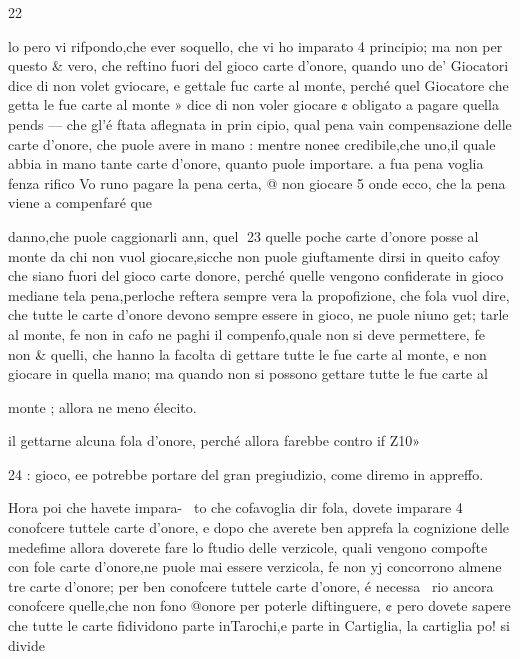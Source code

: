 \documentclass[12pt,a6paper]{article}
\begin{document}
 
 

 

 

 

 

 

 

22

lo pero vi rifpondo,che ever
soquello, che vi ho imparato 4
principio; ma non per questo &
vero, che reftino fuori del gioco carte d’onore, quando uno
de’ Giocatori dice di non volet
gviocare, e gettale fuc carte al
monte, perché quel Giocatore
che getta le fue carte al monte »
dice di non voler giocare ¢
obligato a pagare quella pends —
che gl’é ftata aflegnata in prin
cipio, qual pena vain compensazione delle carte d’onore, che
puole avere in mano : mentre
none¢ credibile,che uno,il quale
abbia in mano tante carte d’onore, quanto puole importare. a
fua pena voglia fenza rifico Vo
runo pagare la pena certa, @
non giocare 5 onde ecco, che la
pena viene a compenfaré que

danno,che puole caggionarli ann,
quel
23
quelle poche carte d’onore posse al monte da chi non vuol
giocare,sicche non puole giuftamente dirsi in queito cafoy che
siano fuori del gioco carte
donore, perché quelle vengono confiderate in gioco mediane
tela pena,perloche reftera sempre vera la propofizione, che
fola vuol dire, che tutte le carte d’onore devono sempre essere in gioco, ne puole niuno get;
tarle al monte, fe non in cafo
ne paghi il compenfo,quale non
si deve permettere, fe non &
quelli, che hanno la facolta di
gettare tutte le fue carte al
monte, e non giocare in quella
mano; ma quando non si possono gettare tutte le fue carte al

monte ; allora ne meno élecito.

il gettarne alcuna fola d’onore,
perché allora farebbe contro if
Z10»

 

 
 

24 :
gioco, ee potrebbe portare del
gran pregiudizio, come diremo
in appreffo.

Hora poi che havete impara-~
to che cofavoglia dir fola, dovete imparare 4 conofcere tuttele carte d’onore, e dopo che
averete ben apprefa la cognizione delle medefime allora doverete fare lo ftudio delle verzicole, quali vengono compofte
con fole carte d’onore,ne puole
mai essere verzicola, fe non yj
concorrono almene tre carte
d’onore; per ben conofcere tuttele carte d’onore, é necessa~
rio ancora conofcere quelle,che
non fono @onore per poterle
diftinguere, ¢ pero dovete sapere che tutte le carte fidividono
parte inTarochi,e parte in Cartiglia, la cartiglia po! si divide
\end{document}
